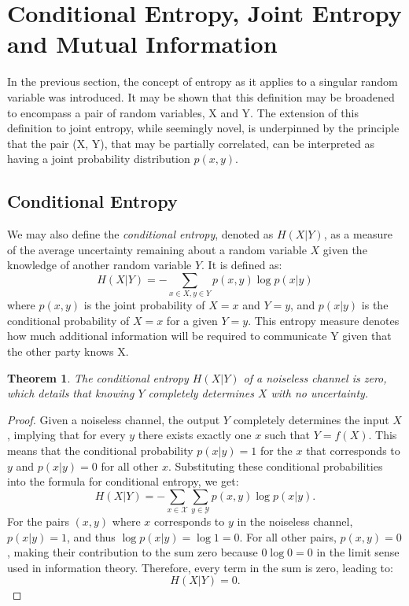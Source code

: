 \documentclass[12pt]{article}
\newtheorem{theorem}{Theorem}
\begin{document}
		\section*{Conditional Entropy, Joint Entropy and Mutual Information}
		In the previous section, the concept of entropy as it applies to a singular random variable was introduced. It may be shown that this definition may be broadened to encompass a pair of random variables, X and Y. The extension of this definition to joint entropy, while seemingly novel, is underpinned by the principle that the pair (X, Y), that may be partially correlated, can be interpreted as having a joint probability distribution \(p(x, y)\).
		
		\subsection{Conditional Entropy}
		We may also define the \emph{conditional entropy}, denoted as \(H(X|Y)\), as a measure of the average uncertainty remaining about a random variable \(X\) given the knowledge of another random variable \(Y\).  It is defined as:
		\[
		H(X|Y) = -\sum_{x \in X, y \in Y} p(x, y) \log p(x|y)
		\]
		where \(p(x, y)\) is the joint probability of \(X=x\) and \(Y=y\), and \( p(x|y) \) is the conditional probability of \(X = x\) for a given \(Y = y\).  This entropy measure denotes how much additional information will be required 
		to communicate Y given that the other party knows X.
		
		
		\begin{theorem}
			The conditional entropy $H(X|Y)$ of a noiseless channel is zero, which details that knowing $Y$ completely determines $X$ with no uncertainty.
		\end{theorem}
		\begin{proof}
			Given a noiseless channel, the output $Y$ completely determines the input $X$, implying that for every $y$ there exists exactly one $x$ such that $Y = f(X)$. This means that the conditional probability $p(x|y) = 1$ for the $x$ that corresponds to $y$ and $p(x|y) = 0$ for all other $x$. Substituting these conditional probabilities into the formula for conditional entropy, we get:
			\begin{equation}
				H(X|Y) = -\sum_{x \in \mathcal{X}} \sum_{y \in \mathcal{Y}} p(x, y) \log p(x|y).
			\end{equation}
			For the pairs $(x, y)$ where $x$ corresponds to $y$ in the noiseless channel, $p(x|y) = 1$, and thus $\log p(x|y) = \log 1 = 0$. For all other pairs, $p(x, y) = 0$, making their contribution to the sum zero because $0 \log 0 = 0$ in the limit sense used in information theory. Therefore, every term in the sum is zero, leading to:
			\begin{equation}
				H(X|Y) = 0.
			\end{equation}
		\end{proof}
		
\end{document}
